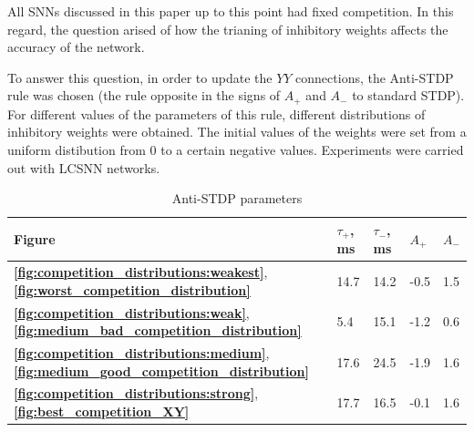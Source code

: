 \documentclass[a4paper,10pt]{article}
\newcommand{\refbf}[1]{\textbf{\ref{#1}}}
\begin{document}
All SNNs discussed in this paper up to this point had fixed competition. In this regard, the question arised of how the trianing of inhibitory weights affects the accuracy of the network.

To answer this question, in order to update the $ YY $ connections, the Anti-STDP rule was chosen (the rule opposite in the signs of $ A_{+} $ and $ A_{-} $ to standard STDP). For different values of the parameters of this rule, different distributions of inhibitory weights were obtained. The initial values of the weights were set from a uniform distibution from 0 to a certain negative values. Experiments were carried out with LCSNN networks.

\begin{table}[H]
 \caption{Anti-STDP parameters}
\begin{center}
\begin{tabular}{|l|l|l|l|l|}
\hline
Figure & {$\tau_{+}$, ms} & {$\tau_{-}$, ms} & {$A_{+}$} & {$A_{-}$} \\
\hline
\refbf{fig:competition_distributions:weakest}, \refbf{fig:worst_competition_distribution} & 14.7 & 14.2 & -0.5 & 1.5 \\
\hline
\refbf{fig:competition_distributions:weak}, \refbf{fig:medium_bad_competition_distribution} & 5.4 & 15.1 & -1.2 & 0.6 \\
\hline
\refbf{fig:competition_distributions:medium}, \refbf{fig:medium_good_competition_distribution} & 17.6 & 24.5 & -1.9 & 1.6 \\
\hline
\refbf{fig:competition_distributions:strong}, \refbf{fig:best_competition_XY} & 17.7 & 16.5 & -0.1 & 1.6\\
\hline
\end{tabular}
\end{center}
\end{table}
\end{document}
